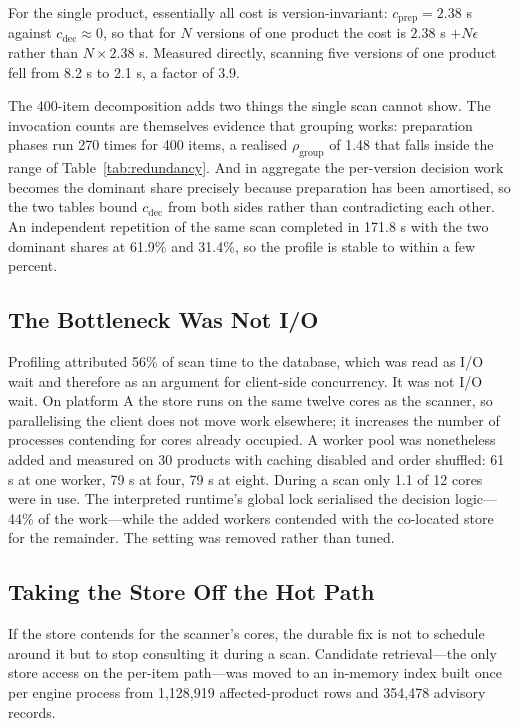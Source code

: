 \documentclass[fleqn,10pt,lineno]{wlpeerj}
\begin{document}
For the single product, essentially all cost is version-invariant: $c_{\text{prep}} = 2.38$ s against $c_{\text{dec}} \approx 0$, so that for $N$ versions of one product the cost is $2.38$ s $+ N\epsilon$ rather than $N \times 2.38$ s. Measured directly, scanning five versions of one product fell from 8.2 s to 2.1 s, a factor of 3.9.

The 400-item decomposition adds two things the single scan cannot show. The invocation counts are themselves evidence that grouping works: preparation phases run 270 times for 400 items, a realised $\rho_{\text{group}}$ of 1.48 that falls inside the range of Table~\ref{tab:redundancy}. And in aggregate the per-version decision work becomes the dominant share precisely because preparation has been amortised, so the two tables bound $c_{\text{dec}}$ from both sides rather than contradicting each other. An independent repetition of the same scan completed in 171.8 s with the two dominant shares at 61.9\% and 31.4\%, so the profile is stable to within a few percent.

\subsection{The Bottleneck Was Not I/O}
Profiling attributed 56\% of scan time to the database, which was read as I/O wait and therefore as an argument for client-side concurrency. It was not I/O wait. On platform A the store runs on the same twelve cores as the scanner, so parallelising the client does not move work elsewhere; it increases the number of processes contending for cores already occupied. A worker pool was nonetheless added and measured on 30 products with caching disabled and order shuffled: 61 s at one worker, 79 s at four, 79 s at eight. During a scan only 1.1 of 12 cores were in use. The interpreted runtime's global lock serialised the decision logic---44\% of the work---while the added workers contended with the co-located store for the remainder. The setting was removed rather than tuned.

\subsection{Taking the Store Off the Hot Path}
\label{sec:index}
If the store contends for the scanner's cores, the durable fix is not to schedule around it but to stop consulting it during a scan. Candidate retrieval---the only store access on the per-item path---was moved to an in-memory index built once per engine process from 1,128,919 affected-product rows and 354,478 advisory records.
\end{document}
